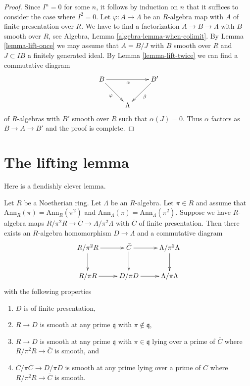 \begin{proof}
Since $I^n = 0$ for some $n$, it follows by induction on $n$ that
it suffices to consider the case where $I^2 = 0$. Let
$\varphi : A \to \Lambda$ be an $R$-algebra map with $A$ of finite
presentation over $R$. We have to find a factorization $A \to B \to \Lambda$
with $B$ smooth over $R$, see Algebra, Lemma \ref{algebra-lemma-when-colimit}.
By Lemma \ref{lemma-lift-once} we may assume that
$A = B/J$ with $B$ smooth over $R$ and $J \subset IB$
a finitely generated ideal. By
Lemma \ref{lemma-lift-twice}
we can find a commutative diagram
$$
\xymatrix{
B \ar[rr]_\alpha \ar[rd]_\varphi & & B' \ar[ld]^\beta \\
& \Lambda
}
$$
of $R$-algebras with $B'$ smooth over $R$ such that $\alpha(J) = 0$.
Thus $\alpha$ factors as $B \to A \to B'$ and the proof is complete.
\end{proof}






\section{The lifting lemma}
\label{section-lifting-lemma}

\noindent
Here is a fiendishly clever lemma.

\begin{lemma}
\label{lemma-lifting}
Let $R$ be a Noetherian ring. Let $\Lambda$ be an $R$-algebra.
Let $\pi \in R$ and assume that $\text{Ann}_R(\pi) = \text{Ann}_R(\pi^2)$ and
$\text{Ann}_\Lambda(\pi) = \text{Ann}_\Lambda(\pi^2)$.
Suppose we have $R$-algebra maps
$R/\pi^2R \to \bar C \to \Lambda/\pi^2\Lambda$
with $\bar C$ of finite presentation.
Then there exists an $R$-algebra homomorphism
$D \to \Lambda$ and a commutative diagram
$$
\xymatrix{
R/\pi^2R \ar[r] \ar[d] &
\bar C \ar[r] \ar[d] &
\Lambda/\pi^2\Lambda \ar[d] \\
R/\pi R \ar[r] &
D/\pi D \ar[r] &
\Lambda/\pi \Lambda
}
$$
with the following properties
\begin{enumerate}
\item[(a)] $D$ is of finite presentation,
\item[(b)] $R \to D$ is smooth at any prime $\mathfrak q$ with
$\pi \not \in \mathfrak q$,
\item[(c)] $R \to D$ is smooth at any prime $\mathfrak q$ with
$\pi \in \mathfrak q$ lying over a prime of $\bar C$ where
$R/\pi^2 R \to \bar C$ is smooth, and
\item[(d)] $\bar C/\pi \bar C \to D/\pi D$ is smooth at any prime
lying over a prime of $\bar C$ where $R/\pi^2R \to \bar C$ is smooth.
\end{enumerate}
\end{lemma}

